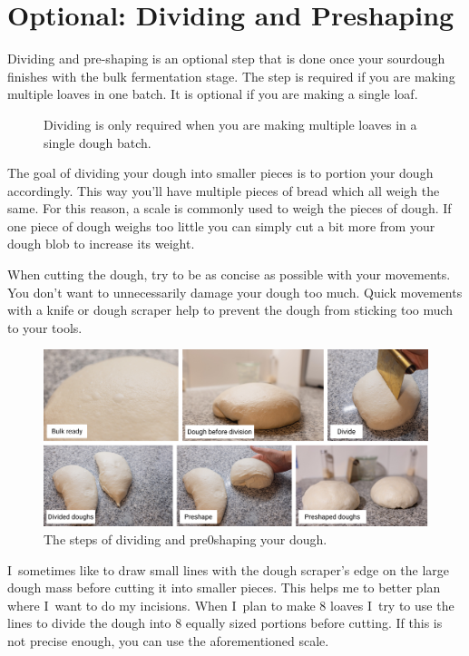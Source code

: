 \section{Optional: Dividing and Preshaping}

Dividing and pre-shaping is an optional step that is done
once your sourdough finishes with the bulk fermentation stage.
The step is required if you are making multiple loaves in one
batch. It is optional if you are making a single loaf.

\begin{figure}[!htb]
\begin{center}
  
  \caption{Dividing is only required when you are making multiple loaves in a
  single dough batch.}%
  \label{fig:dividing-decision-tree}
\end{center}
\end{figure}

The goal of dividing your dough into smaller pieces is to portion
your dough accordingly. This way you'll have multiple pieces of bread
which all weigh the same. For this reason, a scale is commonly
used to weigh the pieces of dough. If one piece of dough weighs
too little you can simply cut a bit more from your dough blob
to increase its weight.

When cutting the dough, try to be as concise as possible with your
movements. You don't want to unnecessarily damage your dough too much.
Quick movements with a knife or dough scraper help to prevent the
dough from sticking too much to your tools.

\begin{figure}[!htb]
  \includegraphics[width=\textwidth]{divide-preshape}
  \caption{The steps of dividing and pre0shaping your dough.}
\end{figure}

I~sometimes like to draw small lines with the dough scraper's edge
on the large dough mass before cutting it into smaller pieces.
This helps me to better plan where I~want to do my incisions. When
I~plan to make 8 loaves I~try to use the lines to divide the dough
into 8 equally sized portions before cutting. If this is not precise enough,
you can use the aforementioned scale.

